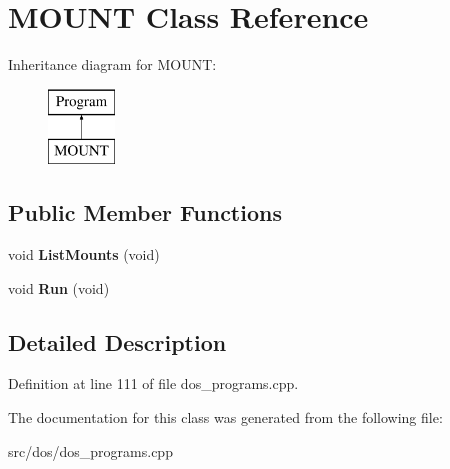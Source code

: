 \hypertarget{classMOUNT}{\section{M\-O\-U\-N\-T Class Reference}
\label{classMOUNT}
}
Inheritance diagram for M\-O\-U\-N\-T\-:\begin{figure}[H]
\begin{center}
\leavevmode
\includegraphics[height=2.000000cm]{classMOUNT}
\end{center}
\end{figure}
\subsection*{Public Member Functions}
\begin{DoxyCompactItemize}
\item 
\hypertarget{classMOUNT_a162c6c15860f047f90e4a632cd80f769}{void {\bfseries List\-Mounts} (void)}\label{classMOUNT_a162c6c15860f047f90e4a632cd80f769}

\item 
\hypertarget{classMOUNT_aecbba89c92ac2fbd78a929ed04818d58}{void {\bfseries Run} (void)}\label{classMOUNT_aecbba89c92ac2fbd78a929ed04818d58}

\end{DoxyCompactItemize}


\subsection{Detailed Description}


Definition at line 111 of file dos\-\_\-programs.\-cpp.



The documentation for this class was generated from the following file\-:\begin{DoxyCompactItemize}
\item 
src/dos/dos\-\_\-programs.\-cpp\end{DoxyCompactItemize}
